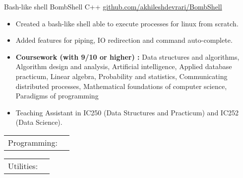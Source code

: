 \documentclass[]{awesome-cv}
\begin{document}
\begin{cventries}
	\vspace{-5mm}
	\cventry
	{Bash-like shell}
	{BombShell}
	{C++}
	{\href{https://github.com/akhileshdevrari/BombShell}{github.com/akhileshdevrari/BombShell}}
	{
		\vspace{-3mm}
		\begin{itemize}
			\item Created a bash-like shell able to execute processes for linux from scratch.
			\item Added features for piping, IO redirection and command auto-complete.
		\end{itemize}	
	}
	
\end{cventries}


\vspace{-5mm}




\begin{itemize}
	\item \textbf{Coursework (with 9/10 or higher) :} Data structures and algorithms, Algorithm design and analysis, Artificial intelligence, Applied database practicum, Linear algebra, Probability and statistics, Communicating distributed processes, Mathematical foundations of computer science, Paradigms of programming
	\item Teaching Assistant in IC250 (Data Structures and Practicum) and IC252 (Data Science).
\end{itemize}

\begin{cventries}
	\vspace{-4mm}
	\cventry
	{}
	{\def\arraystretch{1.15}{\begin{tabular}{ l l }
				Programming:  & {\skill{ Comfortable: C/C++ \hspace{1cm} Familiar: C#, Python, Javascript, Scala, Prolog, PHP}} \\
			\end{tabular}}}
			{}
			{}
			{}
			
			\vspace{-10mm}
			\cventry
			{}
			{\def\arraystretch{1.15}{\begin{tabular}{ l l }
						Utilities:  & {\skill{ MySQL, Git, Linux shell utilities, HTML/CSS}} \\
					\end{tabular}
			}
	}
					{}
					{}
					{}
\end{cventries}				


\vspace{-8mm}
\ 
\end{document}

